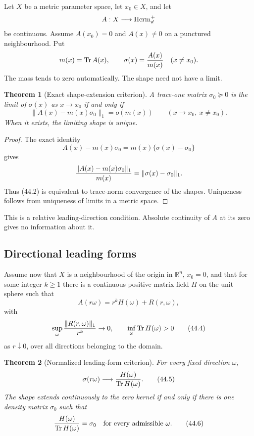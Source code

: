 \documentclass[11pt]{article}
\newtheorem{theorem}{Theorem}[section]
\theoremstyle{remark}
\begin{document}
Let \(X\) be a metric parameter space, let \(x_0\in X\), and let
\[
 A:X\longrightarrow{\rm Herm}_d^+
\]
be continuous.  Assume \(A(x_0)=0\) and \(A(x)\ne0\) on a punctured
neighbourhood.  Put
\[
 m(x)=\operatorname{Tr}A(x),\qquad
 \sigma(x)={A(x)\over m(x)}
 \quad(x\ne x_0).
\]
The mass tends to zero automatically.  The shape need not have a
limit.

\begin{theorem}[Exact shape-extension criterion]
\label{thm:v12v44-extension}
A trace-one matrix \(\sigma_0\succeq0\) is the limit of
\(\sigma(x)\) as \(x\to x_0\) if and only if
\begin{equation}
 \|A(x)-m(x)\sigma_0\|_1=o(m(x))
 \qquad(x\to x_0,\ x\ne x_0).                    \tag{44.2}
\end{equation}
When it exists, the limiting shape is unique.
\end{theorem}

\begin{proof}
The exact identity
\[
 A(x)-m(x)\sigma_0
 =
 m(x)\{\sigma(x)-\sigma_0\}
\]
gives
\[
 {\|A(x)-m(x)\sigma_0\|_1\over m(x)}
 =
 \|\sigma(x)-\sigma_0\|_1.
\]
Thus (44.2) is equivalent to trace-norm convergence of the shapes.
Uniqueness follows from uniqueness of limits in a metric space.
\end{proof}

This is a relative leading-direction condition.  Absolute continuity
of \(A\) at its zero gives no information about it.

\subsection{Directional leading forms}

Assume now that \(X\) is a neighbourhood of the origin in
\(\mathbb R^n\), \(x_0=0\), and that for some integer \(k\geq1\)
there is a continuous positive matrix field \(H\) on the unit sphere
such that
\begin{equation}
 A(r\omega)
 =
 r^kH(\omega)+R(r,\omega),                       \tag{44.3}
\end{equation}
with
\begin{equation}
 \sup_\omega{\|R(r,\omega)\|_1\over r^k}\to0,
 \qquad
 \inf_\omega\operatorname{Tr}H(\omega)>0          \tag{44.4}
\end{equation}
as \(r\downarrow0\), over all directions belonging to the domain.

\begin{theorem}[Normalized leading-form criterion]
\label{thm:v12v44-leading}
For every fixed direction \(\omega\),
\begin{equation}
 \sigma(r\omega)
 \longrightarrow
 {H(\omega)\over\operatorname{Tr}H(\omega)}.
                                                        \tag{44.5}
\end{equation}
The shape extends continuously to the zero kernel if and only if
there is one density matrix \(\sigma_0\) such that
\begin{equation}
 {H(\omega)\over\operatorname{Tr}H(\omega)}
 =
 \sigma_0
 \quad\text{for every admissible }\omega.         \tag{44.6}
\end{equation}
\end{theorem}
\end{document}
